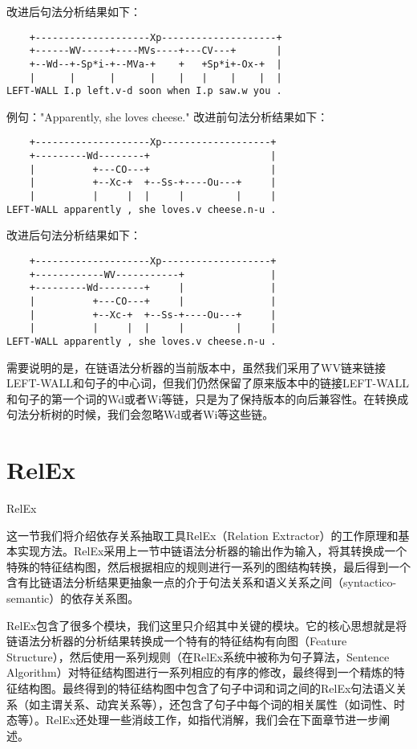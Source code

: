 改进后句法分析结果如下：
\begin{verbatim}
    +--------------------Xp--------------------+
    +------WV-----+----MVs----+---CV---+       |
    +--Wd--+-Sp*i-+--MVa-+    +   +Sp*i+-Ox-+  |
    |      |      |      |    |   |    |    |  |
LEFT-WALL I.p left.v-d soon when I.p saw.w you .
\end{verbatim}

例句："Apparently, she loves cheese."
改进前句法分析结果如下：
\begin{verbatim}
    +--------------------Xp-------------------+
    +---------Wd--------+                     |
    |          +---CO---+                     |
    |          +--Xc-+  +--Ss-+----Ou---+     |
    |          |     |  |     |         |     |
LEFT-WALL apparently , she loves.v cheese.n-u .
\end{verbatim}

改进后句法分析结果如下：

\begin{verbatim}
    +--------------------Xp-------------------+
    +------------WV-----------+               |
    +---------Wd--------+     |               |
    |          +---CO---+     |               |
    |          +--Xc-+  +--Ss-+----Ou---+     |
    |          |     |  |     |         |     |
LEFT-WALL apparently , she loves.v cheese.n-u .
\end{verbatim}

需要说明的是，在链语法分析器的当前版本中，虽然我们采用了WV链来链接LEFT-WALL和句子的中心词，但我们仍然保留了原来版本中的链接LEFT-WALL和句子的第一个词的Wd或者Wi等链，只是为了保持版本的向后兼容性。在转换成句法分析树的时候，我们会忽略Wd或者Wi等这些链。

\section{RelEx}{RelEx}

这一节我们将介绍依存关系抽取工具RelEx（Relation Extractor）的工作原理和基本实现方法。RelEx采用上一节中链语法分析器的输出作为输入，将其转换成一个特殊的特征结构图，然后根据相应的规则进行一系列的图结构转换，最后得到一个含有比链语法分析结果更抽象一点的介于句法关系和语义关系之间（syntactico-semantic）的依存关系图。

RelEx包含了很多个模块，我们这里只介绍其中关键的模块。它的核心思想就是将链语法分析器的分析结果转换成一个特有的特征结构有向图（Feature Structure），然后使用一系列规则（在RelEx系统中被称为句子算法，Sentence Algorithm）对特征结构图进行一系列相应的有序的修改，最终得到一个精炼的特征结构图。最终得到的特征结构图中包含了句子中词和词之间的RelEx句法语义关系（如主谓关系、动宾关系等），还包含了句子中每个词的相关属性（如词性、时态等）。RelEx还处理一些消歧工作，如指代消解，我们会在下面章节进一步阐述。

